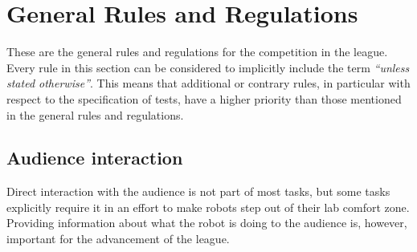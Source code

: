 \chapter{General Rules and Regulations}
\label{chap:rules}

These are the general rules and regulations for the competition in the \RoboCup\AtHome{} league.
Every rule in this section can be considered to implicitly include the term \emph{\enquote{unless stated otherwise}}.
This means that additional or contrary rules, in particular with respect to the specification of tests, have a higher priority than those mentioned in the general rules and regulations.



\section{Audience interaction}

Direct interaction with the audience is not part of most tasks, but some tasks explicitly require it in an effort to make robots step out of their lab comfort zone.
Providing information about what the robot is doing to the audience is, however, important for the advancement of the league.





















